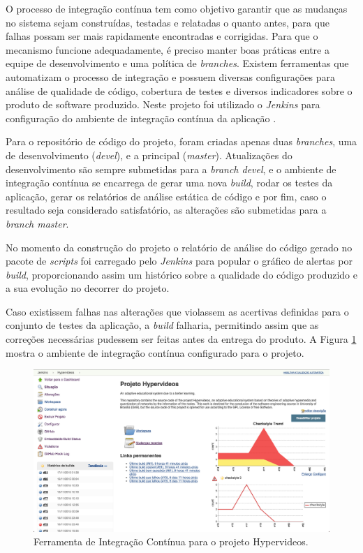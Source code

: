 O processo de integração contínua tem como objetivo garantir que as mudanças no sistema sejam construídas, testadas e relatadas o quanto antes, para que falhas possam ser mais rapidamente encontradas e corrigidas. Para que o mecanismo funcione adequadamente, é preciso manter boas práticas entre a equipe de desenvolvimento e uma política de \textit{branches}. Existem ferramentas que automatizam o processo de integração e possuem diversas configurações para análise de qualidade de código, cobertura de testes e diversos indicadores sobre o produto de software produzido. Neste projeto foi utilizado o \textit{Jenkins} para configuração do ambiente de integração contínua da aplicação \cite{jenkins2015}.

Para o repositório de código do projeto, foram criadas apenas duas \textit{branches}, uma de desenvolvimento (\textit{devel}), e a principal (\textit{master}). Atualizações do desenvolvimento são sempre submetidas para a \textit{branch devel}, e o ambiente de integração contínua se encarrega de gerar uma nova \textit{build}, rodar os testes da aplicação, gerar os relatórios de análise estática de código e por fim, caso o resultado seja considerado satisfatório, as alterações são submetidas para a \textit{branch master}. 

No momento da construção do projeto o relatório de análise do código gerado no pacote de \textit{scripts} foi carregado pelo \textit{Jenkins} para popular o gráfico de alertas por \textit{build}, proporcionando assim um histórico sobre a qualidade do código produzido e a sua evolução no decorrer do projeto.

Caso existissem falhas nas alterações que violassem as acertivas definidas para o conjunto de testes da aplicação, a \textit{build} falharia, permitindo assim que as correções necessárias pudessem ser feitas antes da entrega do produto. A Figura \ref{fig:jenkins} mostra o ambiente de integração contínua configurado para o projeto.

\begin{figure}[h!]
  	\centering
  	\includegraphics[width=.8\linewidth]{figuras/jenkins.eps}
  	\caption{Ferramenta de Integração Contínua para o projeto Hypervideos.}
  	\label{fig:jenkins}
\end{figure}

